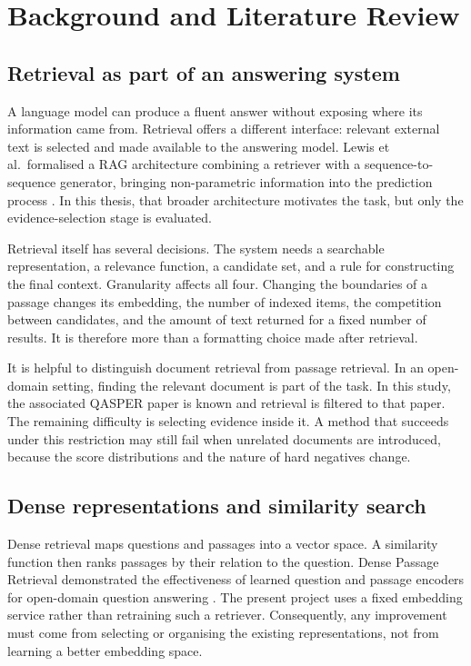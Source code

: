\chapter{Background and Literature Review}
\label{ch:background}

\section{Retrieval as part of an answering system}
A language model can produce a fluent answer without exposing where its
information came from. Retrieval offers a different interface: relevant
external text is selected and made available to the answering model.
Lewis et al.\ formalised a RAG architecture combining a retriever with a
sequence-to-sequence generator, bringing non-parametric information into
the prediction process \cite{lewis2020rag}. In this thesis, that broader
architecture motivates the task, but only the evidence-selection stage
is evaluated.

Retrieval itself has several decisions. The system needs a searchable
representation, a relevance function, a candidate set, and a rule for
constructing the final context. Granularity affects all four. Changing
the boundaries of a passage changes its embedding, the number of indexed
items, the competition between candidates, and the amount of text returned
for a fixed number of results. It is therefore more than a formatting
choice made after retrieval.

It is helpful to distinguish document retrieval from passage retrieval.
In an open-domain setting, finding the relevant document is part of the
task. In this study, the associated QASPER paper is known and retrieval
is filtered to that paper. The remaining difficulty is selecting evidence
inside it. A method that succeeds under this restriction may still fail
when unrelated documents are introduced, because the score distributions
and the nature of hard negatives change.

\section{Dense representations and similarity search}
Dense retrieval maps questions and passages into a vector space. A
similarity function then ranks passages by their relation to the question.
Dense Passage Retrieval demonstrated the effectiveness of learned
question and passage encoders for open-domain question answering
\cite{karpukhin2020dpr}. The present project uses a fixed embedding
service rather than retraining such a retriever. Consequently, any
improvement must come from selecting or organising the existing
representations, not from learning a better embedding space.


